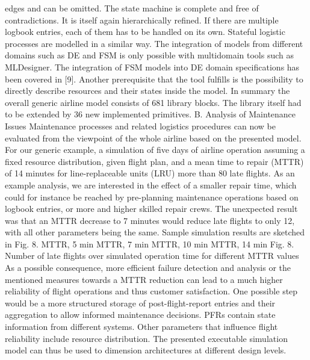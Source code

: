 edges and can be omitted. The state machine is complete and
free of contradictions. It is itself again hierarchically refined.
If there are multiple logbook entries, each of them has to be
handled on its own. Stateful logistic processes are modelled
in a similar way. The integration of models from different
domains such as DE and FSM is only possible with multidomain tools such as MLDesigner. The integration of FSM
models into DE domain specifications has been covered in
[9]. Another prerequisite that the tool fulfills is the possibility
to directly describe resources and their states inside the model.
In summary the overall generic airline model consists of
681 library blocks. The library itself had to be extended by 36
new implemented primitives.
B. Analysis of Maintenance Issues
Maintenance processes and related logistics procedures can
now be evaluated from the viewpoint of the whole airline
based on the presented model. For our generic example, a
simulation of five days of airline operation assuming a fixed
resource distribution, given flight plan, and a mean time to
repair (MTTR) of 14 minutes for line-replaceable units (LRU)
more than 80 late flights. As an example analysis, we are
interested in the effect of a smaller repair time, which could for
instance be reached by pre-planning maintenance operations
based on logbook entries, or more and higher skilled repair
crews. The unexpected result was that an MTTR decrease
to 7 minutes would reduce late flights to only 12, with all
other parameters being the same. Sample simulation results
are sketched in Fig. 8.
MTTR, 5 min
MTTR, 7 min
MTTR, 10 min
MTTR, 14 min
Fig. 8. Number of late flights over simulated operation time for different
MTTR values
As a possible consequence, more efficient failure detection
and analysis or the mentioned measures towards a MTTR
reduction can lead to a much higher reliability of flight
operations and thus customer satisfaction. One possible step
would be a more structured storage of post-flight-report entries
and their aggregation to allow informed maintenance decisions.
PFRs contain state information from different systems. Other
parameters that influence flight reliability include resource
distribution. The presented executable simulation model can
thus be used to dimension architectures at different design
levels.